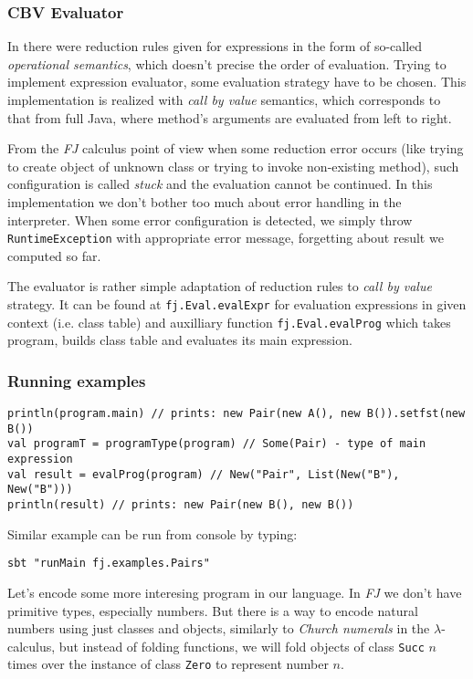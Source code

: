 \documentclass{article}[12pt]
\begin{document}
\subsubsection{CBV Evaluator}

In \cite{fj} there were reduction rules given for expressions in
the form of so-called \emph{operational semantics}, which doesn't
precise the order of evaluation. Trying to implement expression
evaluator, some evaluation strategy have to be chosen. This
implementation is realized with \emph{call by value} semantics,
which corresponds to that from full Java, where method's arguments
are evaluated from left to right.

From the \emph{FJ} calculus point of view when some reduction error
occurs (like trying to create object of unknown class or trying to
invoke non-existing method), such configuration is called \emph{stuck}
and the evaluation cannot be continued. In this implementation we
don't bother too much about error handling in the interpreter.
When some error configuration is detected, we simply throw
\texttt{RuntimeException} with appropriate error message, forgetting
about result we computed so far.

The evaluator is rather simple adaptation of reduction rules to
\emph{call by value} strategy. It can be found at
\texttt{fj.Eval.evalExpr} for evaluation expressions in given
context (i.e. class table) and auxilliary function
\texttt{fj.Eval.evalProg} which takes program, builds class table
and evaluates its main expression.

\subsubsection{Running examples}

\begin{verbatim}
println(program.main) // prints: new Pair(new A(), new B()).setfst(new B())
val programT = programType(program) // Some(Pair) - type of main expression
val result = evalProg(program) // New("Pair", List(New("B"), New("B")))
println(result) // prints: new Pair(new B(), new B())
\end{verbatim}
Similar example can be run from console by typing:

\begin{verbatim}
sbt "runMain fj.examples.Pairs"
\end{verbatim}

Let's encode some more interesing program in our language. In
\emph{FJ} we don't have primitive types, especially numbers.
But there is a way to encode natural numbers using just classes
and objects, similarly to \emph{Church numerals} in
the $\lambda$-calculus, but instead of folding functions, we
will fold objects of class \texttt{Succ} $n$ times over the
instance of class \texttt{Zero} to represent number $n$.
\end{document}

